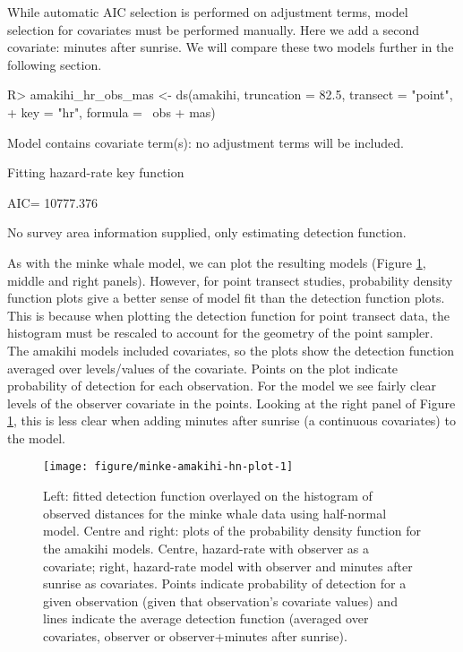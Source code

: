 \documentclass[article]{jss}\usepackage[]{graphicx}\usepackage[]{color}
\makeatletter
\def\maxwidth{ %
  \ifdim\Gin@nat@width>\linewidth
    \linewidth
  \else
    \Gin@nat@width
  \fi
}
\makeatother
\begin{document}
While automatic AIC selection is performed on adjustment terms, model selection for covariates must be performed manually. Here we add a second covariate: minutes after sunrise. We will compare these two models further in the following section.
\begin{Schunk}
\begin{Sinput}
R> amakihi_hr_obs_mas <- ds(amakihi, truncation = 82.5, transect = "point",
+                          key = "hr", formula = ~obs + mas)
\end{Sinput}
\begin{Soutput}
Model contains covariate term(s): no adjustment terms will be included.
\end{Soutput}
\begin{Soutput}
Fitting hazard-rate key function
\end{Soutput}
\begin{Soutput}
AIC= 10777.376
\end{Soutput}
\begin{Soutput}
No survey area information supplied, only estimating detection function.
\end{Soutput}
\end{Schunk}
As with the minke whale model, we can plot the resulting models (Figure \ref{fig:minkeamakihi}, middle and right panels). However, for point transect studies, probability density function plots give a better sense of model fit than the detection function plots. This is because when plotting the detection function for point transect data, the histogram must be rescaled to account for the geometry of the point sampler. The amakihi models included covariates, so the plots show the detection function averaged over levels/values of the covariate. Points on the plot indicate probability of detection for each observation. For the  model we see fairly clear levels of the observer covariate in the points. Looking at the right panel of Figure \ref{fig:minkeamakihi}, this is less clear when adding minutes after sunrise (a continuous covariates) to the model.

\begin{figure}
\begin{center}
\begin{Schunk}

\texttt{[image: figure/minke-amakihi-hn-plot-1]} \end{Schunk}
\caption{Left: fitted detection function overlayed on the histogram of observed distances for the minke whale data using half-normal model. Centre and right: plots of the probability density function for the amakihi models. Centre, hazard-rate with observer as a covariate; right, hazard-rate model with observer and minutes after sunrise as covariates. Points indicate probability of detection for a given observation (given that observation's covariate values) and lines indicate the average detection function (averaged over covariates, observer or observer+minutes after sunrise).}
\label{fig:minkeamakihi}
\end{center}
\end{figure}
\end{document}
